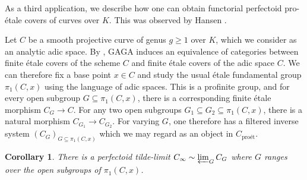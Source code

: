 \documentclass[10pt,oneside]{amsart}
\newtheorem{corollary}[theorem]{Corollary}
\theoremstyle{definition}
\begin{document}
As a third application, we describe how one can obtain functorial perfectoid pro-\'etale covers of curves over $K$. This was observed by Hansen \cite{Hansen-blog}.
	
	Let $C$ be a smooth projective curve of genus $g\geq 1$ over $K$, which we consider as an analytic adic space. By \cite[Theorem 3.1]{LutRiemann}, GAGA induces an equivalence of categories between finite \'etale covers of the scheme $C$ and finite \'etale covers of the adic space $C$. We can therefore fix a base point $x\in C$ and study the usual \'etale fundamental group $\pi_1(C,x)$ using the language of adic spaces. This is a profinite group, and for every open subgroup $G\subseteq \pi_1(C,x)$, there is a corresponding finite \'etale morphism $C_G\to C$. For any two open subgroups $G_1\subseteq G_2\subseteq \pi_1(C,x)$, there is a natural morphism $C_{G_1}\to C_{G_2}$. For varying $G$, one therefore has a filtered inverse system $(C_G)_{G\subseteq \pi_1(C,x)}$ which we may regard as an object in $C_{\text{pro\'et}}$.
	\begin{corollary}
		There is a perfectoid tilde-limit $C_\infty \sim \varprojlim_{G}C_G$ where $G$ ranges over the open subgroups of $ \pi_1(C,x)$.
	\end{corollary}
	
\end{document}
